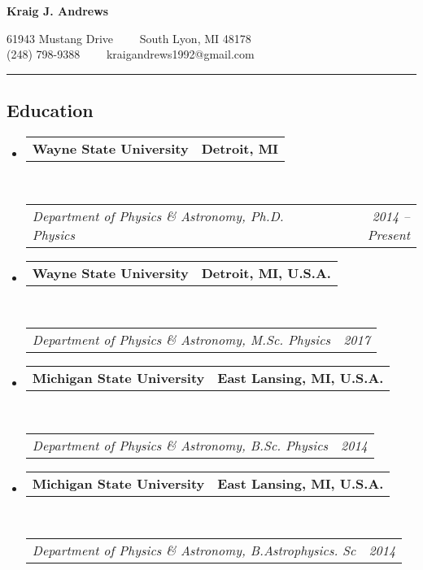 \documentclass[10pt,letterpaper]{article}
\makeatletter
\newcommand{\headerrow}[2]
{\begin{tabular*}{\linewidth}{l@{\extracolsep{\fill}}r}
	#1 &
	#2 \\
\end{tabular*}}
\makeatother
\begin{document}
\begin{center}
{\LARGE \textbf{Kraig J. Andrews}}

61943 Mustang Drive\ \ \textbullet
\ \ South Lyon, MI 48178
\\
(248) 798-9388\ \ \textbullet
\ \ kraigandrews1992@gmail.com
\end{center}

\hrule
\vspace{-0.4em}
\subsection*{Education}

\begin{itemize}
	\parskip=0.1em

    \item 
    \headerrow
        {\textbf{Wayne State University}}
        {\textbf{Detroit, MI}}
    \\
    \headerrow
        {\emph{Department of Physics \& Astronomy, Ph.D. Physics}}
        {\emph{2014 -- Present}}
    
    \item 
    \headerrow
        {\textbf{Wayne State University}}
        {\textbf{Detroit, MI, U.S.A.}}
    \\
    \headerrow
        {\emph{Department of Physics \& Astronomy, M.Sc. Physics}}
        {\emph{2017}}

	\item 
	\headerrow
		{\textbf{Michigan State University}}
		{\textbf{East Lansing, MI, U.S.A.}}
	\\
	\headerrow
		{\emph{Department of Physics \& Astronomy, B.Sc. Physics}}
        {\emph{2014}}
    
    \item 
    \headerrow
        {\textbf{Michigan State University}}
        {\textbf{East Lansing, MI, U.S.A.}}
    \\
    \headerrow
        {\emph{Department of Physics \& Astronomy, B.Astrophysics. Sc}}
        {\emph{2014}}

\end{itemize}
\end{document}
